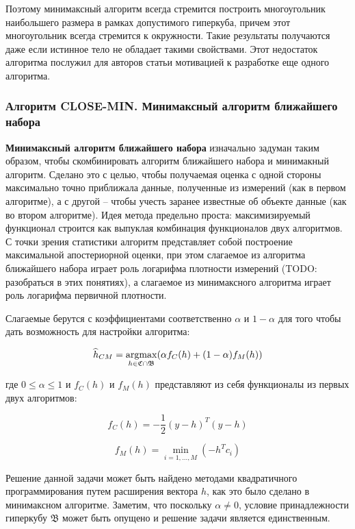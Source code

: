 \documentclass[a4paper, 12pt, titlepage]{article}
\theoremstyle{definition}
\theoremstyle{plain}
\begin{document}
Поэтому минимаксный алгоритм всегда стремится построить многоугольник
наибольшего размера в рамках допустимого гиперкуба, причем этот многоугольник
всегда стремится к окружности. Такие результаты получаются даже если истинное
тело не обладает такими свойствами. Этот недостаток алгоритма послужил для
авторов статьи мотивацией к разработке еще одного алгоритма.

\subsubsection{Алгоритм CLOSE-MIN. Минимаксный алгоритм ближайшего набора}
\label{sec:history/PrinceW90/algo-CLOSE-MIN}

\textbf{Минимаксный алгоритм ближайшего набора} изначально задуман таким
образом, чтобы скомбинировать алгоритм ближайшего набора и минимакный алгоритм.
Сделано это с целью, чтобы получаемая оценка с одной стороны максимально точно
приближала данные, полученные из измерений (как в первом алгоритме), а с другой
-- чтобы учесть заранее известные об объекте данные (как во втором алгоритме).
Идея метода предельно проста: максимизируемый функционал строится как выпуклая
комбинация функционалов двух алгоритмов. С точки зрения статистики алгоритм
представляет собой построение максимальной апостериорной оценки, при этом
слагаемое из алгоритма ближайшего набора играет роль логарифма плотности
измерений (TODO: разобраться в этих понятиях), а слагаемое из минимаксного
алгоритма играет роль логарифма первичной плотности.

Слагаемые берутся с коэффициентами соответственно $\alpha$ и $1 - \alpha$ для
того чтобы дать возможность для настройки алгоритма:

\begin{equation}
\widehat{h}_{CM} =
\operatornamewithlimits{argmax}_{h \in \mathfrak{C} \cap \mathfrak{B}}
(\alpha f_{C}(h) + (1 - \alpha) f_{M}(h))
\end{equation}

где $0 \leq \alpha \leq 1$ и $f_{C}(h)$ и $f_{M}(h)$ представляют из себя
функционалы из первых двух алгоритмов:

\begin{equation}
f_{C}(h) = - \frac{1}{2} (y - h)^{T} (y - h)
\end{equation}

\begin{equation}
f_{M}(h) = \min_{i = 1, \ldots, M} (- h^{T} c_{i})
\end{equation}

Решение данной задачи может быть найдено методами квадратичного
программирования путем расширения вектора $h$, как это было сделано в
минимаксном алгоритме. Заметим, что поскольку $\alpha \neq 0$, условие
принадлежности гиперкубу $\mathfrak{B}$ может быть опущено и решение задачи
является единственным.
\end{document}
